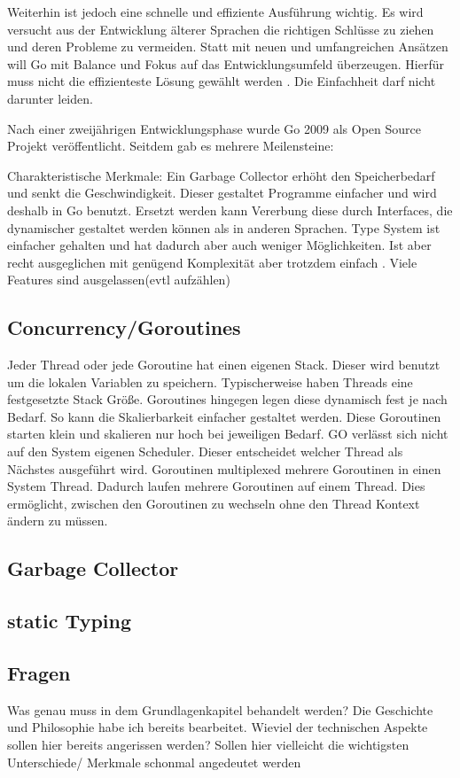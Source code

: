 Weiterhin ist jedoch eine schnelle und effiziente Ausführung wichtig. Es wird versucht aus der Entwicklung älterer Sprachen die richtigen Schlüsse zu ziehen und deren Probleme zu vermeiden. Statt mit neuen und umfangreichen Ansätzen will Go mit Balance und Fokus auf das Entwicklungsumfeld überzeugen. Hierfür muss nicht die effizienteste Lösung gewählt werden \cite{pike_less_2012}. Die Einfachheit darf nicht darunter leiden.\cite{cox_go_2022}

Nach einer zweijährigen Entwicklungsphase wurde Go 2009 als Open Source Projekt veröffentlicht. \cite{meyerson_go_2014}
Seitdem gab es mehrere Meilensteine:

Charakteristische Merkmale: 
Ein Garbage Collector erhöht den Speicherbedarf und senkt die Geschwindigkeit. Dieser gestaltet Programme einfacher und wird deshalb in Go benutzt. Ersetzt werden kann Vererbung diese durch Interfaces, die dynamischer gestaltet werden können als in anderen Sprachen. 
Type System ist einfacher gehalten und hat dadurch aber auch weniger Möglichkeiten. Ist aber recht ausgeglichen mit genügend Komplexität aber trotzdem einfach \cite{donovan_go_2016}.
Viele Features sind ausgelassen(evtl aufzählen)

\subsection{Concurrency/Goroutines}
Jeder Thread oder jede Goroutine hat einen eigenen Stack. Dieser wird benutzt um die lokalen Variablen zu speichern. Typischerweise haben Threads eine festgesetzte Stack Größe. Goroutines hingegen legen diese dynamisch fest je nach Bedarf. So kann die Skalierbarkeit einfacher gestaltet werden. Diese Goroutinen starten klein und skalieren nur hoch bei jeweiligen Bedarf. 
GO verlässt sich nicht auf den System eigenen Scheduler. Dieser entscheidet welcher Thread als Nächstes ausgeführt wird. Goroutinen multiplexed mehrere Goroutinen in einen System Thread. Dadurch laufen mehrere Goroutinen auf einem Thread. Dies ermöglicht, zwischen den Goroutinen zu wechseln ohne den Thread Kontext ändern zu müssen. 
\subsection{Garbage Collector}
\subsection{static Typing}
\subsection{Fragen}

Was genau muss in dem Grundlagenkapitel behandelt werden? Die Geschichte und Philosophie habe ich bereits bearbeitet. Wieviel der technischen Aspekte sollen hier bereits angerissen werden? Sollen hier vielleicht die wichtigsten Unterschiede/ Merkmale schonmal angedeutet werden